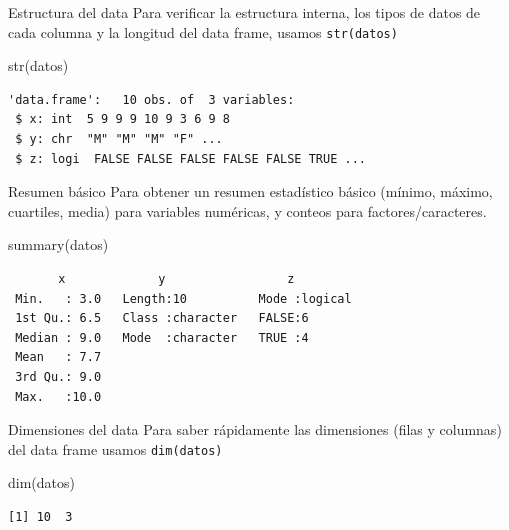 \documentclass[
  ignorenonframetext,
  aspectratio=169,
  spanish,
]{beamer}
\newenvironment{Shaded}{\begin{snugshade}}{\end{snugshade}}
\newcommand{\FunctionTok}[1]{\textcolor[rgb]{0.28,0.35,0.67}{#1}}
\newcommand{\NormalTok}[1]{\textcolor[rgb]{0.00,0.23,0.31}{#1}}
\begin{document}
\begin{frame}[fragile]{Estructura del data}
\label{estructura-del-data}
Para verificar la estructura interna, los tipos de datos de cada columna
y la longitud del data frame, usamos \texttt{str(datos)}

\begin{Shaded}
\begin{Highlighting}[]
\FunctionTok{str}\NormalTok{(datos)}
\end{Highlighting}
\end{Shaded}

\begin{verbatim}
'data.frame':   10 obs. of  3 variables:
 $ x: int  5 9 9 9 10 9 3 6 9 8
 $ y: chr  "M" "M" "M" "F" ...
 $ z: logi  FALSE FALSE FALSE FALSE FALSE TRUE ...
\end{verbatim}
\end{frame}

\begin{frame}[fragile]{Resumen básico}
\label{resumen-buxe1sico}
Para obtener un resumen estadístico básico (mínimo, máximo, cuartiles,
media) para variables numéricas, y conteos para factores/caracteres.

\begin{Shaded}
\begin{Highlighting}[]
\FunctionTok{summary}\NormalTok{(datos) }
\end{Highlighting}
\end{Shaded}

\begin{verbatim}
       x             y                 z          
 Min.   : 3.0   Length:10          Mode :logical  
 1st Qu.: 6.5   Class :character   FALSE:6        
 Median : 9.0   Mode  :character   TRUE :4        
 Mean   : 7.7                                     
 3rd Qu.: 9.0                                     
 Max.   :10.0                                     
\end{verbatim}
\end{frame}

\begin{frame}[fragile]{Dimensiones del data}
\label{dimensiones-del-data}
Para saber rápidamente las dimensiones (filas y columnas) del data frame
usamos \texttt{dim(datos)}

\begin{Shaded}
\begin{Highlighting}[]
\FunctionTok{dim}\NormalTok{(datos)}
\end{Highlighting}
\end{Shaded}

\begin{verbatim}
[1] 10  3
\end{verbatim}
\end{frame}
\end{document}
